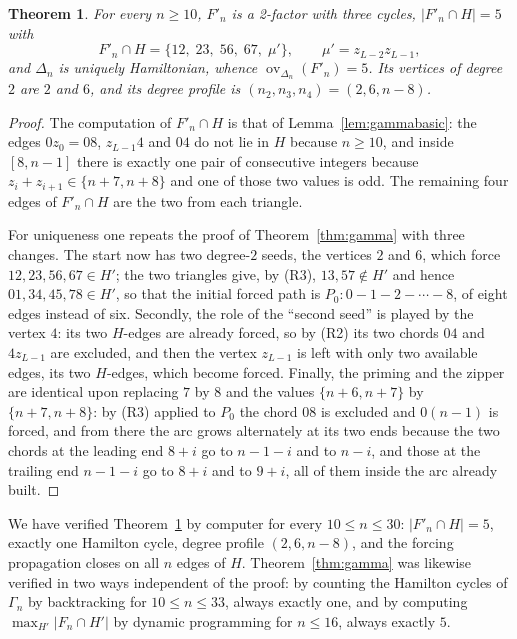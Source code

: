 \documentclass[11pt,a4paper]{article}
\newtheorem{theorem}{Theorem}[section]
\theoremstyle{definition}
\theoremstyle{remark}
\newcommand{\ov}{\operatorname{ov}}
\begin{document}
\begin{theorem}\label{thm:delta}
For every $n\ge10$, $F'_n$ is a 2-factor with \emph{three} cycles, $|F'_n\cap H|=5$ with
\[
F'_n\cap H=\{12,\;23,\;56,\;67,\;\mu'\},\qquad \mu'=z_{L-2}z_{L-1},
\]
and $\Delta_n$ is uniquely Hamiltonian, whence $\ov_{\Delta_n}(F'_n)=5$. Its vertices of degree $2$ are $2$ and $6$, and its degree profile is $(n_2,n_3,n_4)=(2,6,n-8)$.
\end{theorem}

\begin{proof}
The computation of $F'_n\cap H$ is that of Lemma~\ref{lem:gammabasic}: the edges $0z_0=08$, $z_{L-1}4$ and $04$ do not lie in $H$ because $n\ge10$, and inside $[8,n-1]$ there is exactly one pair of consecutive integers because $z_i+z_{i+1}\in\{n+7,n+8\}$ and one of those two values is odd. The remaining four edges of $F'_n\cap H$ are the two from each triangle.

For uniqueness one repeats the proof of Theorem~\ref{thm:gamma} with three changes. The start now has two degree-$2$ seeds, the vertices $2$ and $6$, which force $12,23,56,67\in H'$; the two triangles give, by (R3), $13,57\notin H'$ and hence $01,34,45,78\in H'$, so that the initial forced path is $P_0:0-1-2-\cdots-8$, of eight edges instead of six. Secondly, the role of the ``second seed'' is played by the vertex $4$: its two $H$-edges are already forced, so by (R2) its two chords $04$ and $4z_{L-1}$ are excluded, and then the vertex $z_{L-1}$ is left with only two available edges, its two $H$-edges, which become forced. Finally, the priming and the zipper are identical upon replacing $7$ by $8$ and the values $\{n+6,n+7\}$ by $\{n+7,n+8\}$: by (R3) applied to $P_0$ the chord $08$ is excluded and $0(n{-}1)$ is forced, and from there the arc grows alternately at its two ends because the two chords at the leading end $8+i$ go to $n-1-i$ and to $n-i$, and those at the trailing end $n-1-i$ go to $8+i$ and to $9+i$, all of them inside the arc already built.
\end{proof}

We have verified Theorem~\ref{thm:delta} by computer for every $10\le n\le30$: $|F'_n\cap H|=5$, exactly one Hamilton cycle, degree profile $(2,6,n-8)$, and the forcing propagation closes on all $n$ edges of $H$. Theorem~\ref{thm:gamma} was likewise verified in two ways independent of the proof: by counting the Hamilton cycles of $\Gamma_n$ by backtracking for $10\le n\le33$, always exactly one, and by computing $\max_{H'}|F_n\cap H'|$ by dynamic programming for $n\le16$, always exactly $5$.
\end{document}
